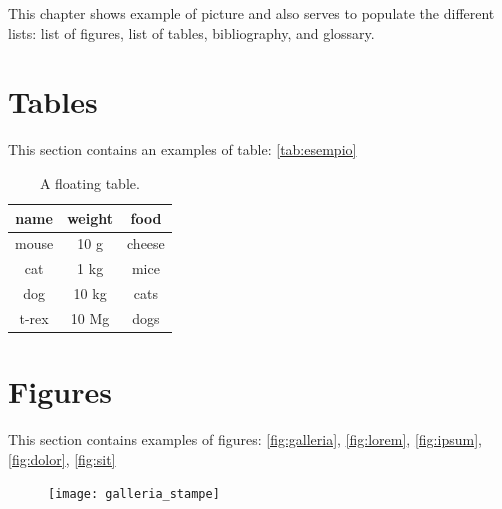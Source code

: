 \newpage

This chapter shows example of picture and also serves to populate the different lists: list of figures, list of tables, bibliography, and glossary.

\section{Tables}

This section contains an examples of table: \autoref{tab:esempio}

\begin{table}[H]
	\centering
	\begin{tabular}{ccc}
		\toprule
		name & weight & food \\ 
		\midrule
		mouse	& 10 g	& cheese \\
		cat	& 1 kg	& mice \\
		dog	& 10 kg	& cats \\
		t-rex	& 10 Mg	& dogs \\
		\bottomrule 
	\end{tabular}
	\caption[A floating table]{A floating table.}
	\label{tab:esempio}
\end{table}

\section{Figures}

This section contains examples of figures: \autoref{fig:galleria}, \autoref{fig:lorem}, \autoref{fig:ipsum}, \autoref{fig:dolor}, \autoref{fig:sit}

\begin{figure}[H] 
	\centering 
	\texttt{[image: galleria\_stampe]} 
	\label{fig:galleria} 
\end{figure}

